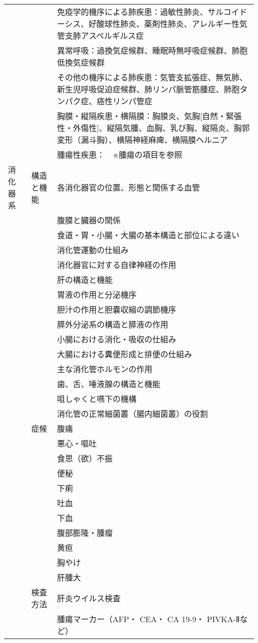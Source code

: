 \begin{xltabular}{\linewidth}{XXX}
 &  & 免疫学的機序による肺疾患：過敏性肺炎、サルコイドーシス、好酸球性肺炎、薬剤性肺炎、アレルギー性気管支肺アスペルギルス症 \\
 &  & 異常呼吸：過換気症候群、睡眠時無呼吸症候群、肺胞低換気症候群 \\
 &  & その他の機序による肺疾患：気管支拡張症、無気肺、新生児呼吸促迫症候群、肺リンパ脈管筋腫症、肺胞タンパク症、癌性リンパ管症 \\
 &  & 胸膜・縦隔疾患・横隔膜：胸膜炎、気胸[自然・緊張性・外傷性]、縦隔気腫、血胸、乳び胸、縦隔炎、胸郭変形（漏斗胸）、横隔神経麻痺、横隔膜ヘルニア \\
 &  & 腫瘍性疾患：　※腫瘍の項目を参照 \\
消化器系 & 構造と機能 & 各消化器官の位置、形態と関係する血管 \\
 &  & 腹膜と臓器の関係 \\
 &  & 食道・胃・小腸・大腸の基本構造と部位による違い \\
 &  & 消化管運動の仕組み \\
 &  & 消化器官に対する自律神経の作用 \\
 &  & 肝の構造と機能 \\
 &  & 胃液の作用と分泌機序 \\
 &  & 胆汁の作用と胆嚢収縮の調節機序 \\
 &  & 膵外分泌系の構造と膵液の作用 \\
 &  & 小腸における消化・吸収の仕組み \\
 &  & 大腸における糞便形成と排便の仕組み \\
 &  & 主な消化管ホルモンの作用 \\
 &  & 歯、舌、唾液腺の構造と機能 \\
 &  & 咀しゃくと嚥下の機構 \\
 &  & 消化管の正常細菌叢（腸内細菌叢）の役割 \\
 & 症候 & 腹痛 \\
 &  & 悪心・嘔吐 \\
 &  & 食思（欲）不振 \\
 &  & 便秘 \\
 &  & 下痢 \\
 &  & 吐血 \\
 &  & 下血 \\
 &  & 腹部膨隆・腫瘤 \\
 &  & 黄疸 \\
 &  & 胸やけ \\
 &  & 肝腫大 \\
 & 検査方法 & 肝炎ウイルス検査 \\
 &  & 腫瘍マーカー（AFP・ CEA・ CA 19-9・ PIVKA-Ⅱなど） \\

\end{xltabular}

